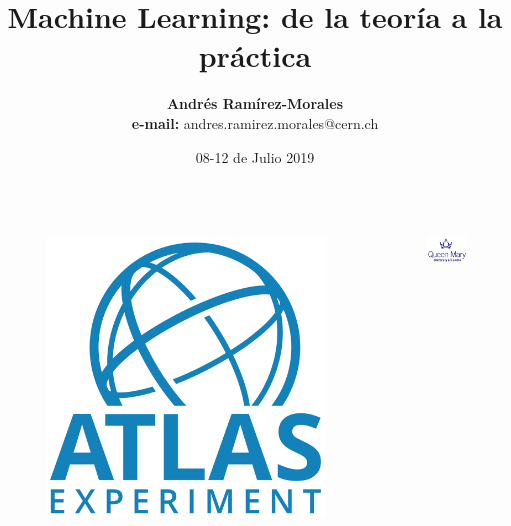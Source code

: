 \documentclass[10pt]{beamer}
\title{Machine Learning: de la teor\'ia a la pr\'actica}
\subtitle{ {}}
\author[Andr\'es Ram\'irez-Morales]{\textbf{Andr\'es Ram\'irez-Morales}\\ \vspace{5mm} \textbf{e-mail:} andres.ramirez.morales@cern.ch}
\institute{Universidad de Londres}
\date{08-12 de Julio 2019}
\begin{document}
\begin{frame}
  
\begin{columns}[T]
\vspace{-3mm}
	\begin{column}{.25\textwidth}
	\begin{figure}
	\includegraphics[scale=0.075]{./Figures/atlas.png}
	\end{figure}
	\end{column}
\vspace{-3mm}	    
	\begin{column}{.25\textwidth}	
	\begin{figure}
	\includegraphics[scale=0.4]{./Figures/QMLogo.jpg}
	\end{figure}
	\end{column}

\end{columns}
\end{frame}
\end{document}
